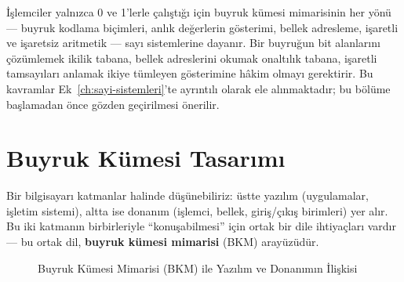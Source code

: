 \begin{bilginot}
İşlemciler yalnızca 0 ve 1'lerle çalıştığı için buyruk kümesi mimarisinin her yönü --- buyruk kodlama biçimleri, anlık değerlerin gösterimi, bellek adresleme, işaretli ve işaretsiz aritmetik --- sayı sistemlerine dayanır. Bir buyruğun bit alanlarını çözümlemek ikilik tabana, bellek adreslerini okumak onaltılık tabana, işaretli tamsayıları anlamak ikiye tümleyen gösterimine hâkim olmayı gerektirir. Bu kavramlar Ek~\ref{ch:sayi-sistemleri}'te ayrıntılı olarak ele alınmaktadır; bu bölüme başlamadan önce gözden geçirilmesi önerilir.
\end{bilginot}


\section{Buyruk Kümesi Tasarımı}
\label{sec:bkm-tasarimi}

Bir bilgisayarı katmanlar halinde düşünebiliriz: üstte yazılım (uygulamalar, işletim sistemi), altta ise donanım (işlemci, bellek, giriş/çıkış birimleri) yer alır. Bu iki katmanın birbirleriyle ``konuşabilmesi'' için ortak bir dile ihtiyaçları vardır --- bu ortak dil, \textbf{buyruk kümesi mimarisi} (BKM) arayüzüdür.

\begin{figure}[H]
\centering
{}
\caption{Buyruk Kümesi Mimarisi (BKM) ile Yazılım ve Donanımın İlişkisi}
\label{fig:bkm-iliskisi}
\end{figure}

